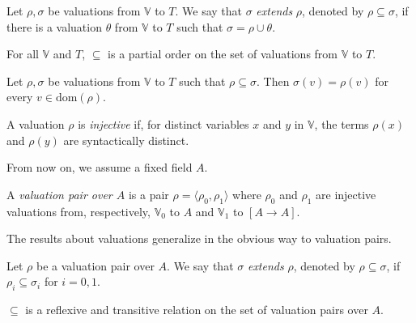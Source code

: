 \documentclass[numreferences]{kluwer}
\newcommand{\V}{{\mathbb V}}
\newcommand{\domain}{\ensuremath{\mathrm{dom}}}
\begin{document}
\begin{article}
\begin{definition}\label{val:incl} Let $\rho,\sigma$ be valuations
from $\V$ to $T$.  We say that $\sigma$ \emph{extends} $\rho$, denoted
by $\rho\subseteq\sigma$, if there is a valuation $\theta$ from $\V$
to $T$ such that $\sigma=\rho\cup\theta$.
\end{definition}

\begin{proposition}\label{val:incl:props}
For all $\V$ and $T$, $\subseteq$ is a partial order on the set of
valuations from $\V$ to $T$.
\end{proposition}

\begin{proposition}\label{val:incl:wdef}
Let $\rho,\sigma$ be valuations from $\V$ to $T$ such that
$\rho\subseteq\sigma$.  Then $\sigma(v)=\rho(v)$ for every
$v\in\domain(\rho)$.
\end{proposition}

\begin{definition} A valuation $\rho$ is \emph{injective} if, for
distinct variables $x$ and $y$ in $\V$, the terms $\rho(x)$
and $\rho(y)$ are syntactically distinct.
\end{definition}

From now on, we assume a fixed field $A$.

\begin{definition}\label{valpair} A \emph{valuation pair over $A$}
is a pair $\rho=\langle\rho_0,\rho_1\rangle$ where $\rho_0$ and
$\rho_1$ are injective valuations from, respectively, $\V_0$ to $A$
and $\V_1$ to $[A\to A]$.
\end{definition}

The results about valuations generalize in the obvious way to
valuation pairs.

\begin{definition}\label{valpair:incl}
Let $\rho$ be a valuation pair over $A$.  We say that $\sigma$
\emph{extends} $\rho$, denoted by $\rho\subseteq\sigma$, if
$\rho_i\subseteq\sigma_i$ for $i=0,1$.
\end{definition}

\begin{proposition}\label{valpair:incl:props}
$\subseteq$ is a reflexive and transitive relation on the set of valuation
pairs over $A$.
\end{proposition}


\end{article}
\end{document}
